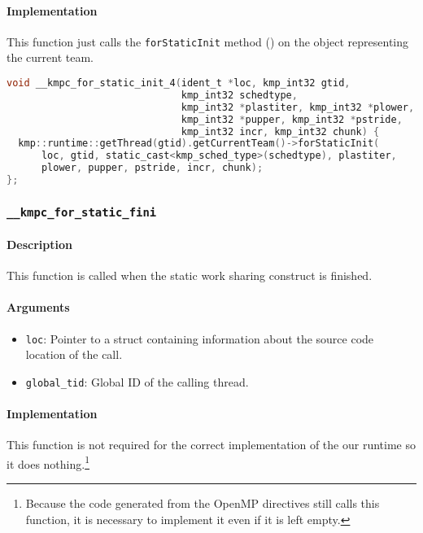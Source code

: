 \paragraph{Implementation} This function just calls the \texttt{forStaticInit} method ()
on the object representing the current team.

\begin{lstlisting}[language=C, caption={\_\_kmpc\_for\_static\_init\_4}, label={lst:for-static-init-4},
                   escapechar=@]
void __kmpc_for_static_init_4(ident_t *loc, kmp_int32 gtid,
                              kmp_int32 schedtype,
                              kmp_int32 *plastiter, kmp_int32 *plower,
                              kmp_int32 *pupper, kmp_int32 *pstride,
                              kmp_int32 incr, kmp_int32 chunk) {
  kmp::runtime::getThread(gtid).getCurrentTeam()->forStaticInit(
      loc, gtid, static_cast<kmp_sched_type>(schedtype), plastiter,
      plower, pupper, pstride, incr, chunk);
};
\end{lstlisting}

\subsubsection{\texttt{\_\_kmpc\_for\_static\_fini}}

\paragraph{Description} This function is called when the static work sharing construct is finished.

\paragraph{Arguments}
\begin{itemize}
	\item \texttt{loc}: Pointer to a struct containing information about the source code location
	      of the call.
	\item \texttt{global\_tid}: Global ID of the calling thread.
\end{itemize}

\paragraph{Implementation} This function is not required for the correct implementation of the our
runtime so it does nothing.\footnote{Because the code generated from the OpenMP directives still
	calls this function, it is necessary to implement it even if it is left empty.}

